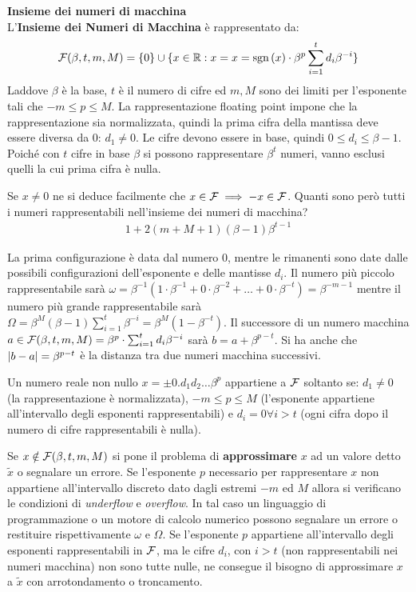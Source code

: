 \begin{defn}
    \textbf{Insieme dei numeri di macchina} \\
    L'\textbf{Insieme dei Numeri di Macchina} è rappresentato da:
\begin{eqnarray*}
\mathcal{F}(\beta, t, m, M) = \{0\} \cup \{x \in \mathbb{R} : x = x = \text{sgn}\left(x\right) \cdot \beta^p \sum_{i=1}^{t} d_i \beta^{-i} \}
\end{eqnarray*}
Laddove $\beta$ è la base, $t$ è il numero di cifre ed $m, M$ sono dei limiti per l'esponente tali che $-m \leq p \leq M$. La rappresentazione floating point impone che la rappresentazione sia normalizzata, quindi la prima cifra della mantissa deve essere diversa da 0: $d_1 \neq 0$. Le cifre devono essere in base, quindi $0 \leq d_i \leq \beta-1$. Poiché con $t$ cifre in base $\beta$ si possono rappresentare $\beta^t$ numeri, vanno esclusi quelli la cui prima cifra è nulla.


Se $x \neq 0$ ne si deduce facilmente che
$x \in \mathcal{F} \implies -x \in \mathcal{F}$.
Quanti sono però tutti i numeri rappresentabili nell'insieme dei numeri di macchina?
\begin{equation*}
    \begin{aligned}
        1 + 2(m + M + 1) (\beta -1) \beta^{t-1}
    \end{aligned}
\end{equation*}

La prima configurazione è data dal numero 0, mentre le rimanenti sono date dalle possibili configurazioni dell'esponente e delle mantisse $d_i$. Il numero più piccolo rappresentabile sarà $\omega = \beta^{-1}(1 \cdot \beta^{-1} + 0 \cdot \beta^{-2} + \hdots + 0 \cdot \beta^{-t}) = \beta^{-m-1}$ mentre il numero più grande rappresentabile sarà $\Omega = \beta^M (\beta -1) \sum_{i=1}^{t} \beta^{-i} = \beta^M (1-\beta^{-t})$. Il successore di un numero macchina $a \in \mathcal{F}(\beta, t, m, M) = \beta^p \cdot \sum_{i=1}^{t} d_i \beta^{-i}$ sarà $b = a + \beta^{p-t}$. Si ha anche che $\lvert b-a\rvert = \beta^{p-t}$ è la distanza tra due numeri macchina successivi.

Un numero reale non nullo $x = \pm 0.d_1d_2\hdots \beta^p$ appartiene a $\mathcal{F}$ soltanto se: $d_1 \neq 0$ (la rappresentazione è normalizzata), $-m \leq p \leq M$ (l'esponente appartiene all'intervallo degli esponenti rappresentabili) e $d_i = 0 \forall i > t$ (ogni cifra dopo il numero di cifre rappresentabili è nulla).

Se $x \notin \mathcal{F}(\beta, t, m, M)$ si pone il problema di \textbf{approssimare} $x$ ad un valore detto $\tilde{x}$ o segnalare un errore.
Se l'esponente $p$ necessario per rappresentare $x$ non appartiene all'intervallo discreto dato dagli estremi $-m$ ed $M$ allora si verificano
le condizioni di \textit{underflow} e \textit{overflow}. In tal caso un linguaggio di programmazione o un motore di calcolo numerico possono segnalare  un errore o restituire rispettivamente $\omega$ e $\Omega$. Se l'esponente $p$ appartiene all'intervallo degli esponenti rappresentabili in $\mathcal{F}$, ma le cifre $d_i$, con $i > t$ (non rappresentabili nei numeri macchina) non sono tutte nulle, ne consegue il bisogno di approssimare $x$ a $\tilde{x}$ con arrotondamento o troncamento.

\end{defn}

